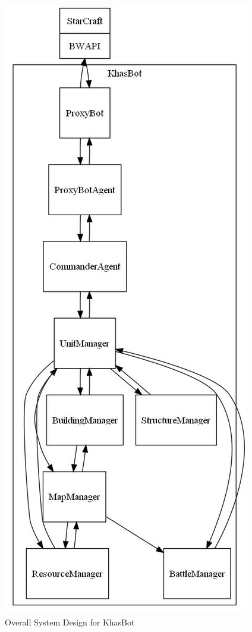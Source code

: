 \documentclass[letterpaper]{article}
\begin{document}
\begin{figure}[hbp]
\begin{center}
\includegraphics[scale=0.5]{totalSystem.jpg}
\caption{Overall System Design for KhasBot}
\label{fig:System}
\end{center}
\end{figure}
\end{document}
